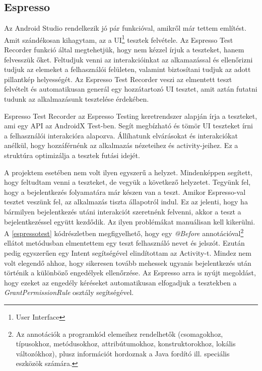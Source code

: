 \documentclass{thesis-ekf}
\theoremstyle{definition}
\theoremstyle{remark}
\begin{document}
\subsection{Espresso}

Az Android Studio rendelkezik jó pár funkcióval, amikről már tettem említést.
Amit szándékosan kihagytam, az a UI\footnote{User Interface} tesztek felvétele.
Az Espresso Test Recorder funkció által megtehetjük, hogy nem kézzel írjuk a teszteket, hanem felvesszük őket.
Feltudjuk venni az interakcióinkat az alkamazással és ellenőrizni tudjuk az elemeket a felhasználói felületen, valamint biztosítani tudjuk az adott pillantkép helyességét.
Az Espresso Test Recorder veszi az elmentett teszt felvételt és automatikusan generál egy hozzátartozó UI tesztet, amit aztán futatni tudunk az alkalmazásunk tesztelése érdekében.

Espresso Test Recorder az Espresso Testing keretrendszer alapján írja a teszteket, ami egy API az AndroidX Test-ben.
Segít megbízható és tömör UI teszteket írni a felhasználói interakcióra alapozva.
Állíhatunk elvárásokat és interakciókat anélkül, hogy hozzáférnénk az alkalmazás nézeteihez és activity-jeihez.
Ez a struktúra optimizálja a tesztek futási idejét. \cite{espresso}

A projektem esetében nem volt ilyen egyszerű a helyzet.
Mindenképpen segített, hogy feltudtam venni a teszteket, de vegyük a következő helyzetet.
Tegyünk fel, hogy a bejelentkezés folyamatára már készen van a teszt.
Amikor Espresso-val tesztet veszünk fel, az alkalmazás tiszta állapotról indul.
Ez az jelenti, hogy ha bármilyen bejelentkezés utáni interakciót szeretnénk felvenni, akkor a teszt a bejelentkezéssel együtt kezdődik.
Az ilyen problémákat manuálisan kell kikerülni.
A \ref{espressotest} kódrészletben megfigyelhető, hogy egy \emph{@Before} annotációval\footnote{Az annotációk a programkód elemeihez rendelhetők (csomagokhoz, típusokhoz, metódusokhoz, attribútumokhoz, konstruktorokhoz, lokális változókhoz), plusz információt hordoznak a Java fordító ill. speciális eszközök számára.\cite{annotaciok}} ellátot metódusban elmentettem egy teszt felhasználó nevet és jelszót.
Ezután pedig egyszerűen egy Intent segítségével elindítottam az Activity-t.
Mindez nem volt elegendő ahhoz, hogy sikeresen tovább mehessek ugyanis bejelentkezés után történik a különböző engedélyek ellenőrzése.
Az Espresso arra is nyújt megoldást, hogy ezeket az engedély kéréseket automatikusan elfogadjuk a tesztekben a \emph{GrantPermissionRule} osztály segítségével.
\end{document}
